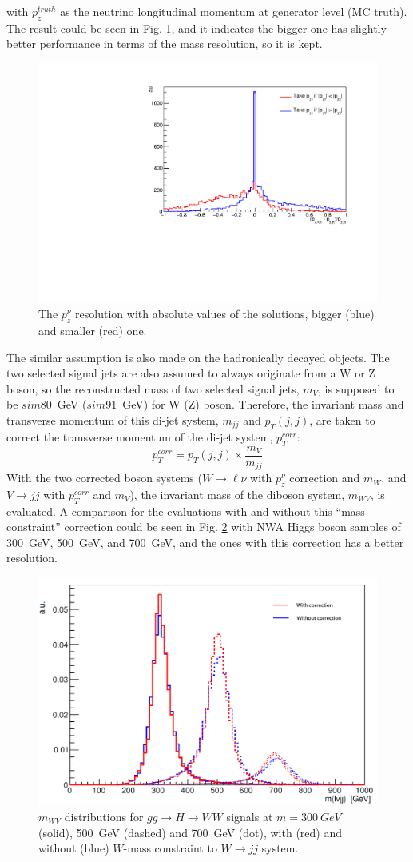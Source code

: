 \noindent
with $p_z^{truth}$ as the neutrino longitudinal momentum at generator level (MC truth). The result could be seen in Fig. \ref{Fig:netrinoPz}, and it indicates the bigger one has slightly better performance in terms of the mass resolution, so it is kept.  
\begin{figure}
	\centering
    \includegraphics[width=0.5\hsize]{Chapter3/neutrinoPz}
    \caption{The $p_{z}^\nu$ resolution with absolute values of the solutions, bigger (blue) and smaller (red) one. }
    \label{Fig:netrinoPz}
\end{figure}
\noindent
The similar assumption is also made on the hadronically decayed objects. The two selected signal jets are also assumed to always originate from a W or Z boson, so the reconstructed mass of two selected signal jets, $m_V$, is supposed to be $sim$80~GeV ($sim$91~GeV) for W (Z) boson. Therefore, the invariant mass and transverse momentum of this di-jet system, $m_{jj}$ and $p_T(j,j)$, are taken to correct the transverse momentum of the di-jet system, $p_{T}^{corr}$:
\begin{equation}
p_{T}^{corr}=p_{T}(j,j)\times \frac{m_{V}}{m_{jj}}
\end{equation}
With the two corrected boson systems ($W\to \ell\nu$ with $p_{z}^{\nu}$ correction and $m_W$, and $V\to jj$ with $p_{T}^{corr}$ and $m_V$), the invariant mass of the diboson system, $m_{WV}$, is evaluated. A comparison for the evaluations with and without this ``mass-constraint'' correction could be seen in Fig. \ref{Fig:WHadmassConst} with NWA Higgs boson samples of 300~GeV, 500~GeV, and 700~GeV, and the ones with this correction has a better resolution.  
\begin{figure}[h]
	\centering
	\includegraphics[width=0.6\hsize]{Chapter3/lvjjmass_WmassConstraint.png}
	\caption{$m_{WV}$ distributions for $gg \rightarrow H \rightarrow WW$ signals at $m=300~GeV$ (solid), 500~GeV (dashed) and 700~GeV (dot), with (red) and without (blue) $W$-mass constraint to $W \rightarrow jj$ system.}\label{Fig:WHadmassConst}
\end{figure}
\noindent
